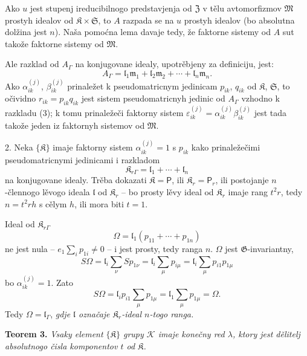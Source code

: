 \documentclass[11pt]{article}
\begin{document}
Ako \(u\) jest stupenj ireducibilnogo predstavjenja od \(\mathfrak Z\) v tělu avtomorfizmov \(\mathfrak M\) prostyh idealov od \(\mathfrak K\times\mathfrak S\), to \(A\) razpada se na \(u\) prostyh idealov (bo absolutna dolžina jest \(n\)). Naša pomoćna lema davaje tedy, že faktorne sistemy od \(A\) sut takože faktorne sistemy od \(\mathfrak M\).

Ale razklad od \(A_\Gamma\) na konjugovane idealy, upotrěbjeny za definiciju, jest:
\[
\tag{3}
A_\Gamma=\mathfrak l_1\mathfrak m_1+\mathfrak l_2\mathfrak m_2+\cdots+\mathfrak l_n\mathfrak m_n.
\]
Ako \(\alpha_{ik}^{(j)}\), \(\beta_{ik}^{(j)}\) prinaležet k pseudomatricnym jedinicam \(p_{ik}\), \(q_{ik}\) od \(\mathfrak K\), \(\mathfrak S\), to očividno \(r_{ik}=p_{ik}q_{ik}\) jest sistem pseudomatricnyh jedinic od \(A_\Gamma\) vzhodno k razkladu (3); k tomu prinaležeči faktorny sistem \(\varepsilon_{ik}^{(j)}=\alpha_{ik}^{(j)}\beta_{ik}^{(j)}\) jest tada takože jeden iz faktornyh sistemov od \(\mathfrak M\).

2. Neka \(\{\mathfrak K\}\) imaje faktorny sistem \(\alpha_{ik}^{(j)}=1\) s \(p_{ik}\) kako prinaležečimi pseudomatricnymi jedinicami i razkladom
\[
\mathfrak K_{r\Gamma}=\mathfrak l_1+\cdots+\mathfrak l_n
\]
na konjugovane idealy. Trěba dokazati \(\mathfrak K=\mathsf P\), ili \(\mathfrak K_r=\mathsf P_r\), ili postojanje \(n\)-člennogo lěvogo ideala \(\mathfrak l\) od \(\mathfrak K_r\) -- bo prosty lěvy ideal od \(\mathfrak K_r\) imaje rang \(t^2r\), tedy \(n=t^2rh\) s cělym \(h\), ili mora biti \(t=1\).

Ideal od \(\mathfrak K_{r\Gamma}\)
\[
\Omega=\mathfrak l_1(p_{11}+\cdots+p_{1n})
\]
ne jest nula -- \(e_1\sum_i p_{1i}\ne0\) -- i jest prosty, tedy ranga \(n\). \(\Omega\) jest \(\mathfrak G\)-invariantny,
\[
S\Omega
=\mathfrak l_i\sum_\nu S p_{1\nu}
=\mathfrak l_i\sum_\mu p_{i\mu}
=\mathfrak l_i\sum_\mu p_{i1}p_{1\mu}
\]
bo \(\alpha_{ik}^{(j)}=1\). Zato
\[
S\Omega=\mathfrak l_ip_{i1}\sum_\mu p_{1\mu}
=\mathfrak l_1\sum_\mu p_{1\mu}
=\Omega.
\]
Tedy \(\Omega=\mathfrak l_\Gamma\), \emph{gdje \(\mathfrak l\) označaje \(\mathfrak K_r\)-ideal \(n\)-togo ranga.}

\textbf{Teorem 3.} \emph{Vsaky element \(\{\mathfrak K\}\) grupy \(\mathscr K\) imaje konečny red \(\lambda\), ktory jest dělitelj absolutnogo čisla komponentov \(t\) od \(\mathfrak K\).}
\end{document}
